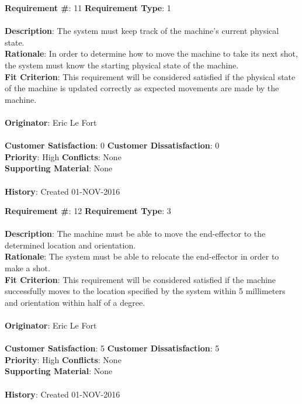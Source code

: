 \documentclass[titlepage]{article}
\begin{document}
\begin{framed}
	\noindent\textbf{Requirement \#}: 11 \hfill \textbf{Requirement Type}: 1 \hfill\\\\
	\noindent\textbf{Description}: The system must keep track of the machine's current physical state.\\
	\textbf{Rationale}: In order to determine how to move the machine to take its next shot, the system must know the starting physical state of the machine.\\
	\textbf{Fit Criterion}: This requirement will be considered satisfied if the physical state of the machine is updated correctly as expected movements are made by the machine.\\\\
	\textbf{Originator}: Eric Le Fort\\\\
	\noindent\textbf{Customer Satisfaction}: 0 \hfill 	\textbf{Customer Dissatisfaction}: 0 \hfill\\
	\textbf{Priority}: High \hfill \textbf{Conflicts}: None \hfill\\
	\textbf{Supporting Material}: None\\\\
	\noindent\textbf{History}: Created 01-NOV-2016
\end{framed}

\begin{framed}
	\noindent\textbf{Requirement \#}: 12 \hfill \textbf{Requirement Type}: 3 \hfill\\\\
	\noindent\textbf{Description}: The machine must be able to move the end-effector to the determined location and orientation.\\
	\textbf{Rationale}: The system must be able to relocate the end-effector in order to make a shot.\\
	\textbf{Fit Criterion}: This requirement will be considered satisfied if the machine successfully moves to the location specified by the system within 5 millimeters and orientation within half of a degree.\\\\
	\textbf{Originator}: Eric Le Fort\\\\
	\noindent\textbf{Customer Satisfaction}: 5 \hfill 	\textbf{Customer Dissatisfaction}: 5 \hfill\\
	\textbf{Priority}: High \hfill \textbf{Conflicts}: None \hfill\\
	\textbf{Supporting Material}: None\\\\
	\noindent\textbf{History}: Created 01-NOV-2016
\end{framed}
\end{document}

